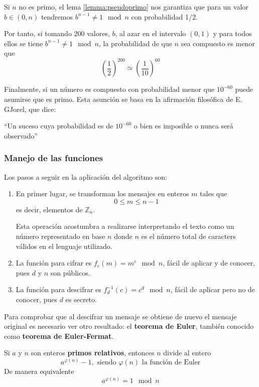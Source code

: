 \documentclass[nochap]{apuntesURJC}
\begin{document}
Si $n$ no es primo, el lema \ref{lemma:pseudoprimo} nos garantiza que para un valor $b \in (0,n)$ tendremos $b^{n-1}\neq 1 \mod n$ con probabilidad 1/2.

Por tanto, si tomando 200 valores, $b$, al azar en el intervalo $(0,1)$ y para todos ellos se tiene $b^{n-1}\neq 1 \mod n$, la probabilidad de que $n$ sea compuesto es menor que
\[\left( \frac{1}{2} \right)^{200} \simeq \left( \frac{1}{10}\right) ^{60}\]

Finalmente, si un número es compuesto con probabilidad menor que $10^{-60}$ puede asumirse que es primo. Esta asunción se basa en la afirmación filosófica de E. GJorel, que dice:
\begin{center}
``Un suceso cuya probabilidad es de $10^{-60}$ o bien es imposible o nunca será observado''
\end{center}

\subsubsection{Manejo de las funciones}

Los pasos a seguir en la aplicación del algoritmo son:
\begin{enumerate}
\item En primer lugar, se transforman los mensajes en enteros $m$ tales que
\[0 \leq m \leq n-1\]
es decir, elementos de $\mathbb{Z}_n$.

Esta operación acostumbra a realizarse interpretando el texto como un número representado en base $n$ donde $n$ es el número total de caracters válidos en el lenguaje utilizado.

\item La función para cifrar es $f_e(m)=m^e \mod n$, fácil de aplicar y de conocer, pues $d$ y $n$ son públicos.

\item La función para descifrar es $f_d^{-1}(c)=c^d \mod n$, fácil de aplicar pero no de conocer, pues $d$ es secreto.

\end{enumerate}

Para comprobar que al descifrar un mensaje se obtiene de nuevo el mensaje original es necesario ver otro resultado: el \textbf{teorema de Euler}, también conocido como \textbf{teorema de Euler-Fermat}.

\begin{theorem}
Si $a$ y $n$ son enteros \textbf{primos relativos}, entonces $n$ divide al entero
\[a^{\varphi(n)}-1, \text{ siendo } \varphi(n) \text{ la función de Euler}\]
De manera equivalente
\[a^{\varphi(n)}=1 \mod n\]
\end{theorem}
\end{document}
